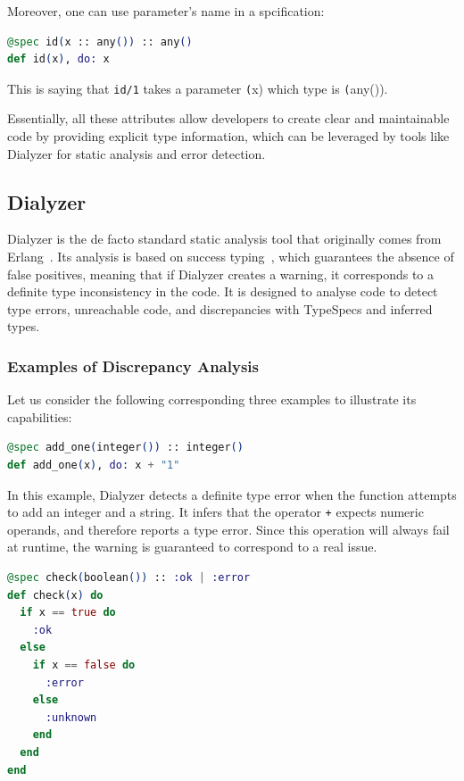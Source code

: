 Moreover, one can use parameter's name in a spcification:
\begin{lstlisting}[language=Elixir, firstnumber=last]
@spec id(x :: any()) :: any()
def id(x), do: x
\end{lstlisting}

This is saying that \texttt{id/1} takes a parameter \texttt(x) which type is \texttt(any()).

Essentially, all these attributes allow developers to create clear and maintainable code by providing explicit type information, which can be leveraged by tools like Dialyzer for static analysis and error detection.

\subsection{Dialyzer}

Dialyzer is the de facto standard static analysis tool that originally comes from Erlang~\cite{lindahl2006practical}.
Its analysis is based on success typing~\cite{lindahl2006practical}, which guarantees the absence of false positives, meaning that if Dialyzer creates a warning, it corresponds to a definite type inconsistency in the code.
It is designed to analyse code to detect type errors, unreachable code, and discrepancies with TypeSpecs and inferred types.

\subsubsection{Examples of Discrepancy Analysis}
Let us consider the following corresponding three examples to illustrate its capabilities:

\begin{lstlisting}[language=Elixir, firstnumber=last]
@spec add_one(integer()) :: integer()
def add_one(x), do: x + "1"
\end{lstlisting}

In this example, Dialyzer detects a definite type error when the function attempts to add an integer and a string. 
It infers that the operator \texttt{+} expects numeric operands, and therefore reports a type error. 
Since this operation will always fail at runtime, the warning is guaranteed to correspond to a real issue.

\begin{lstlisting}[language=Elixir, firstnumber=last]
@spec check(boolean()) :: :ok | :error
def check(x) do
  if x == true do
    :ok
  else
    if x == false do
      :error
    else
      :unknown
    end
  end
end
\end{lstlisting}

